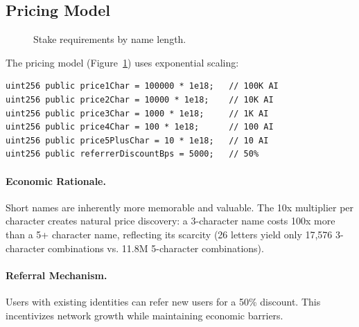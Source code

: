 \subsection{Pricing Model}

\begin{figure}[t]
\centering
{}
\caption{Stake requirements by name length.}
\label{fig:pricing}
\end{figure}

The pricing model (Figure~\ref{fig:pricing}) uses exponential scaling:

\begin{lstlisting}[language=Solidity]
uint256 public price1Char = 100000 * 1e18;   // 100K AI
uint256 public price2Char = 10000 * 1e18;    // 10K AI
uint256 public price3Char = 1000 * 1e18;     // 1K AI
uint256 public price4Char = 100 * 1e18;      // 100 AI
uint256 public price5PlusChar = 10 * 1e18;   // 10 AI
uint256 public referrerDiscountBps = 5000;   // 50%
\end{lstlisting}

\paragraph{Economic Rationale.} Short names are inherently more memorable and valuable. The 10x multiplier per character creates natural price discovery: a 3-character name costs 100x more than a 5+ character name, reflecting its scarcity (26 letters yield only 17,576 3-character combinations vs. 11.8M 5-character combinations).

\paragraph{Referral Mechanism.} Users with existing identities can refer new users for a 50\% discount. This incentivizes network growth while maintaining economic barriers.

